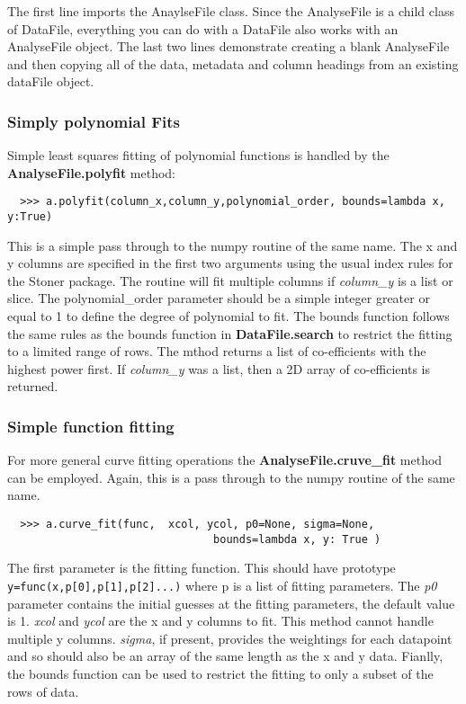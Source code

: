 \documentclass[a4paper,11pt]{scrartcl}
\begin{document}
The first line imports the AnaylseFile class. Since the AnalyseFile is a child class of DataFile, everything you can do with a DataFile also works with an AnalyseFile object. The last two lines demonstrate creating a blank AnalyseFile and then copying all of the data, metadata and column headings from an existing dataFile object.

\subsubsection{Simply polynomial Fits}

Simple least squares fitting of polynomial functions is handled by the \textbf{AnalyseFile.polyfit} method:

\begin{verbatim}
  >>> a.polyfit(column_x,column_y,polynomial_order, bounds=lambda x, y:True)
\end{verbatim}

This is a simple pass through to the numpy routine of the same name. The x and y columns are specified in the first two arguments using the usual index rules for the Stoner package. The routine will fit multiple columns if \textit{column\_y} is a list or slice. The polynomial\_order parameter should be a simple integer greater or equal to 1 to define the degree of polynomial to fit. The bounds function follows the same rules as the bounds function in \textbf{DataFile.search} to restrict the fitting to a limited range of rows. The mthod returns a list of co-efficients with the highest power first. If \textit{column\_y} was a list, then a 2D array of co-efficients is returned.

\subsubsection{Simple function fitting}

For more general curve fitting operations the \textbf{AnalyseFile.cruve\_fit} method can be employed. Again, this is a pass through to the numpy routine of the same name.

\begin{verbatim}
  >>> a.curve_fit(func,  xcol, ycol, p0=None, sigma=None,
                                bounds=lambda x, y: True )
\end{verbatim}

The first parameter is the fitting function. This should have prototype \\\verb:y=func(x,p[0],p[1],p[2]...): where p is a list of fitting parameters. The \textit{p0} parameter contains the initial guesses at the fitting parameters, the default value is 1. \textit{xcol} and \textit{ycol} are the x and y columns to fit. This method cannot handle multiple y columns. \textit{sigma}, if present, provides the weightings for each datapoint and so should also be an array of the same length as the x and y data. Fianlly, the bounds function can be used to restrict the fitting to only a subset of the rows of data.
\end{document}
